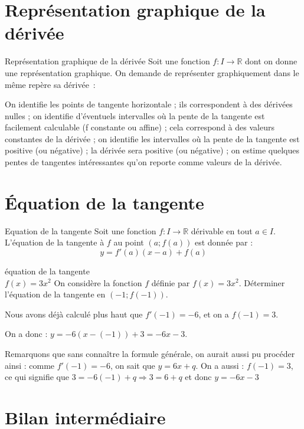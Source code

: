 \documentclass[a4paper,12pt]{article}
\begin{document}
\section{Représentation graphique de la dérivée}
\begin{methode}
	Représentation graphique de la dérivée
	\tcblower
Soit une fonction $f : I \to \mathbb{R}$ dont on donne une représentation graphique. On demande de représenter graphiquement dans le même repère sa dérivée~:
\begin{tasks}
\task On identifie les points de tangente horizontale ; ils correspondent à des dérivées nulles ;
\task on identifie d'éventuels intervalles où la pente de la tangente est facilement calculable (f constante ou affine) ; cela correspond à des valeurs constantes de la dérivée ;
\task on identifie les intervalles où la pente de la tangente est positive (ou négative) ; la dérivée sera positive (ou négative) ;
\task on estime quelques pentes de tangentes intéressantes qu'on reporte comme valeurs de la dérivée.
\end{tasks}
\end{methode}
\section{Équation de la tangente}

\begin{thm}
	Equation de la tangente
	\tcblower
Soit une fonction $f : I \to \mathbb{R}$ dérivable en tout $a \in I$.
L'équation de la tangente à $f$ au point $(a;f(a))$ est donnée par :
\[
y=f'(a)(x-a)+f(a)
\]
\end{thm}

\begin{exemple}
	équation de la tangente \\
	$f(x)=3x^2$
	\tcblower
On considère la fonction $f$ définie par $f(x)=3x^2$. Déterminer l'équation de la tangente en $(-1;f(-1))$.

Nous avons déjà calculé plus haut que $f'(-1)=-6$, et on a $f(-1)=3$.

On a donc : $y=-6(x-(-1))+3=-6x-3$.

Remarquons que sans connaître la formule générale, on aurait aussi pu procéder ainsi : comme $f'(-1)=-6$, on sait que $y=6x+q$. On a aussi : $f(-1)=3$, ce qui signifie que $3=-6(-1)+q \Rightarrow 3=6+q$ et donc $y=-6x-3$
\end{exemple}

\section{Bilan intermédiaire}
\end{document}
